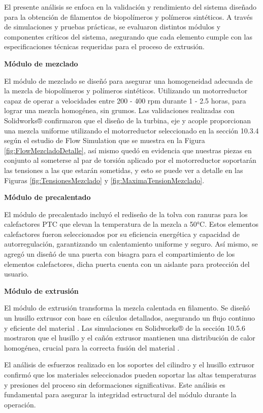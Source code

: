 \documentclass[14pt,oneside]{extarticle} %
\begin{document}
El presente análisis se enfoca en la validación y rendimiento del sistema diseñado para la obtención de filamentos de biopolímeros y polímeros sintéticos. A través de simulaciones y pruebas prácticas, se evaluaron distintos módulos y componentes críticos del sistema, asegurando que cada elemento cumple con las especificaciones técnicas requeridas para el proceso de extrusión.

\textbf{Módulo de mezclado}

El módulo de mezclado se diseñó para asegurar una homogeneidad adecuada de la mezcla de biopolímeros y polímeros sintéticos. Utilizando un motorreductor capaz de operar a velocidades entre 200 - 400 rpm durante 1 - 2.5 horas, para lograr una mezcla homogénea, sin grumos. Las validaciones realizadas con Solidworks® confirmaron que el diseño de la turbina, eje y acople proporcionan una mezcla uniforme utilizando el motorreductor seleccionado en la sección 10.3.4 según el estudio de Flow Simulation que se muestra en la Figura \ref{fig:FlowMezcladoDetalle}, así mismo quedó en evidencia que nuestras piezas en conjunto al someterse al par de torsión aplicado por el motorreductor soportarán las tensiones a las que estarán sometidas, y esto se puede ver a detalle en las Figuras \ref{fig:TensionesMezclado} y \ref{fig:MaximaTensionMezclado}.

\textbf{Módulo de precalentado}

El módulo de precalentado incluyó el rediseño de la tolva con ranuras para los calefactores PTC que elevan la temperatura de la mezcla a 50°C. Estos elementos calefactores fueron seleccionados por su eficiencia energética y capacidad de autorregulación, garantizando un calentamiento uniforme y seguro. Así mismo, se agregó un diseñó de una puerta con bisagra para el compartimiento de los elementos calefactores, dicha puerta cuenta con un aislante para protección del usuario.

\textbf{Módulo de extrusión}

El módulo de extrusión transforma la mezcla calentada en filamento. Se diseñó un husillo extrusor con base en cálculos detallados, asegurando un flujo continuo y eficiente del material . Las simulaciones en Solidworks® de la sección 10.5.6 mostraron que el husillo y el cañón extrusor mantienen una distribución de calor homogénea, crucial para la correcta fusión del material .

El análisis de esfuerzos realizado en los soportes del cilindro y el husillo extrusor confirmó que los materiales seleccionados pueden soportar las altas temperaturas y presiones del proceso sin deformaciones significativas. Este análisis es fundamental para asegurar la integridad estructural del módulo durante la operación.
\end{document}
